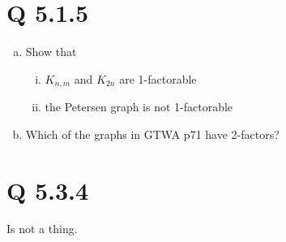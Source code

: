 \section{Q 5.1.5}
	\begin{enumerate}[(a)]
	\item Show that\\
		\begin{enumerate}[(i)]
			\item $K_{n,m}$ and $K_{2n}$ are 1-factorable



			\item the Petersen graph is not 1-factorable
		\end{enumerate}
	\item Which of the graphs in GTWA p71 have 2-factors?

	\end{enumerate}



\section{Q 5.3.4}
	Is not a thing.


